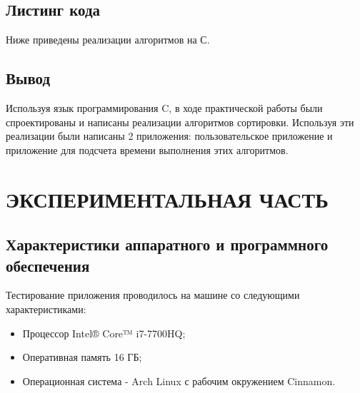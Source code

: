\documentclass[a4paper,12pt]{article}
\begin{document}
\newpage
\subsection{Листинг кода}
Ниже приведены реализации алгоритмов на С.\\


\newpage

\newpage


\newpage
\subsection{Вывод}
Используя язык программирования C, в ходе практической работы были спроектированы и написаны реализации алгоритмов сортировки. Используя эти реализации были написаны 2 приложения: пользовательское приложение и приложение для подсчета времени выполнения этих алгоритмов.

\newpage
\section{ЭКСПЕРИМЕНТАЛЬНАЯ ЧАСТЬ}
\subsection{Характеристики аппаратного и программного обеспечения}
Тестирование приложения проводилось на машине со следующими характеристиками:\\
\begin{itemize}
\item Процессор Intel® Core™ i7-7700HQ;
\item Оперативная память 16 ГБ;
\item Операционная система - Arch Linux с рабочим окружением Cinnamon.
\end{itemize}

\newpage
\end{document}
